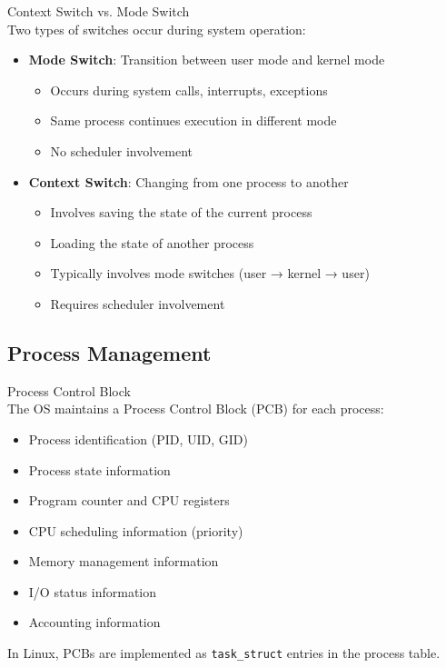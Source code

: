 \begin{definition}{Context Switch vs. Mode Switch}\\
    Two types of switches occur during system operation:
    \begin{itemize}
        \item \textbf{Mode Switch}: Transition between user mode and kernel mode
            \begin{itemize}
                \item Occurs during system calls, interrupts, exceptions
                \item Same process continues execution in different mode
                \item No scheduler involvement
            \end{itemize}
        \item \textbf{Context Switch}: Changing from one process to another
            \begin{itemize}
                \item Involves saving the state of the current process
                \item Loading the state of another process
                \item Typically involves mode switches (user → kernel → user)
                \item Requires scheduler involvement
            \end{itemize}
    \end{itemize}
\end{definition}

\subsection{Process Management}

\begin{definition}{Process Control Block}\\
    The OS maintains a Process Control Block (PCB) for each process:
    \begin{itemize}
        \item Process identification (PID, UID, GID)
        \item Process state information
        \item Program counter and CPU registers
        \item CPU scheduling information (priority)
        \item Memory management information
        \item I/O status information
        \item Accounting information
    \end{itemize}
    
    In Linux, PCBs are implemented as \texttt{task\_struct} entries in the process table.
\end{definition}

